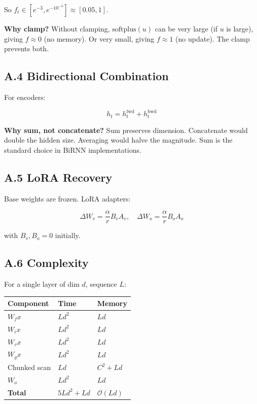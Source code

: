 So $f_t \in [e^{-3}, e^{-10^{-4}}] \approx [0.05, 1]$.

\textbf{Why clamp?} Without clamping, $\text{softplus}(u)$ can be very large (if 
$u$ is large), giving $f \approx 0$ (no memory). Or very small, giving 
$f \approx 1$ (no update). The clamp prevents both.

\subsection{A.4 Bidirectional Combination}

For encoders:

\[
h_t = h_t^\text{fwd} + h_t^\text{bwd}
\tag{A.9}
\]

\textbf{Why sum, not concatenate?} Sum preserves dimension. Concatenate would 
double the hidden size. Averaging would halve the magnitude. Sum is the 
standard choice in BiRNN implementations.

\subsection{A.5 LoRA Recovery}

Base weights are frozen. LoRA adapters:

\[
\Delta W_v = \frac{\alpha}{r} B_v A_v, \quad
\Delta W_o = \frac{\alpha}{r} B_o A_o
\tag{A.10}
\]

with $B_v, B_o = 0$ initially.

\subsection{A.6 Complexity}

For a single layer of dim $d$, sequence $L$:

\begin{table}[H]
\centering
\small
\begin{tabular}{lll}
\toprule
\textbf{Component} & \textbf{Time} & \textbf{Memory} \\
\midrule
$W_f x$ & $L d^2$ & $L d$ \\
$W_i x$ & $L d^2$ & $L d$ \\
$W_v x$ & $L d^2$ & $L d$ \\
$W_g x$ & $L d^2$ & $L d$ \\
Chunked scan & $L d$ & $C^2 + L d$ \\
$W_o$ & $L d^2$ & $L d$ \\
\textbf{Total} & $5 L d^2 + L d$ & $\mathcal{O}(L d)$ \\
\bottomrule
\end{tabular}
\end{table}

